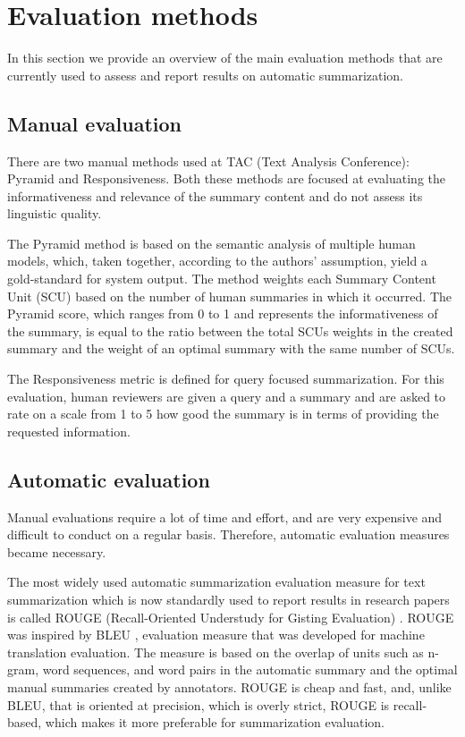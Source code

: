 \documentclass[11pt,a4paper,onecolumn]{article}
\begin{document}
\section{Evaluation methods}
In this section we provide an overview of the main evaluation methods that are currently used to assess and report results on automatic summarization.

\subsection{Manual evaluation}
There are two manual methods used at TAC (Text Analysis Conference): Pyramid and Responsiveness.
Both these methods are focused at evaluating the informativeness and relevance of the summary content and do not assess its linguistic quality.

The Pyramid method \cite{nenkova2007pyramid} is based on the semantic analysis of multiple human models, which, taken together, according to the authors' assumption, yield a gold-standard for system output.
The method weights each Summary Content Unit (SCU) based on the number of human summaries in which it occurred.
The Pyramid score, which ranges from 0 to 1 and represents the informativeness of the summary, is equal to the ratio between the total SCUs weights in the created summary and the weight of an optimal summary with the same number of SCUs.

The Responsiveness metric is defined for query focused summarization.
For this evaluation, human reviewers are given a query and a summary and are asked to rate on a scale from 1 to 5 how good the summary is in terms of providing the requested information.

\subsection{Automatic evaluation}
Manual evaluations require a lot of time and effort, and are very expensive and difficult to conduct on a regular basis.
Therefore, automatic evaluation measures became necessary.

The most widely used automatic summarization evaluation measure for text summarization which is now standardly used to report results in research papers is called ROUGE (Recall-Oriented Understudy for Gisting Evaluation) \cite{lin2004rouge}.
ROUGE was inspired by BLEU \cite{papineni2002bleu}, evaluation measure that was developed for machine translation evaluation.
The measure is based on the overlap of units such as n-gram, word sequences, and word pairs in the automatic summary and the optimal manual summaries created by annotators.
ROUGE is cheap and fast, and, unlike BLEU, that is oriented at precision, which is overly strict, ROUGE is recall-based, which makes it more preferable for summarization evaluation.
\end{document}
